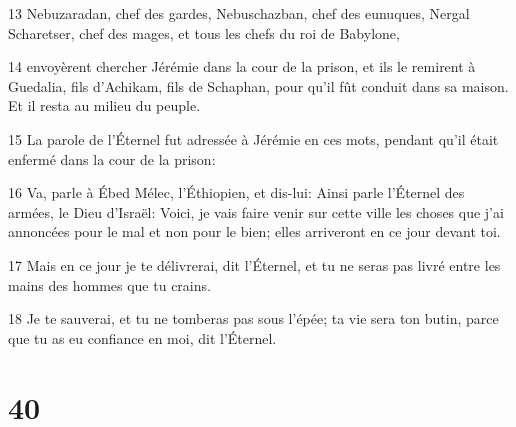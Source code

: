\par 13 Nebuzaradan, chef des gardes, Nebuschazban, chef des eunuques, Nergal Scharetser, chef des mages, et tous les chefs du roi de Babylone,
\par 14 envoyèrent chercher Jérémie dans la cour de la prison, et ils le remirent à Guedalia, fils d'Achikam, fils de Schaphan, pour qu'il fût conduit dans sa maison. Et il resta au milieu du peuple.
\par 15 La parole de l'Éternel fut adressée à Jérémie en ces mots, pendant qu'il était enfermé dans la cour de la prison:
\par 16 Va, parle à Ébed Mélec, l'Éthiopien, et dis-lui: Ainsi parle l'Éternel des armées, le Dieu d'Israël: Voici, je vais faire venir sur cette ville les choses que j'ai annoncées pour le mal et non pour le bien; elles arriveront en ce jour devant toi.
\par 17 Mais en ce jour je te délivrerai, dit l'Éternel, et tu ne seras pas livré entre les mains des hommes que tu crains.
\par 18 Je te sauverai, et tu ne tomberas pas sous l'épée; ta vie sera ton butin, parce que tu as eu confiance en moi, dit l'Éternel.

\chapter{40}

